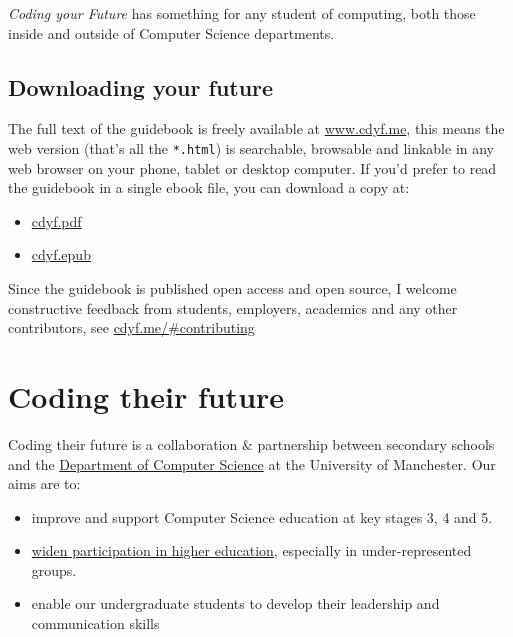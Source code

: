 \documentclass[
  12pt,
]{book}
\providecommand{\tightlist}{%
  \setlength{\itemsep}{0pt}\setlength{\parskip}{0pt}}
\begin{document}
\emph{Coding your Future} has something for any student of computing, both those inside and outside of Computer Science departments. 👨🏿‍💻👨‍💻👩🏽‍💻👩‍💻👩🏿‍💻

\hypertarget{downloading}{%
\section{Downloading your future}\label{downloading}}

The full text of the guidebook is freely available at \href{https://www.cdyf.me/}{www.cdyf.me}, this means the web version (that's all the \texttt{*.html}) is searchable, browsable and linkable in any web browser on your phone, tablet or desktop computer. If you'd prefer to read the guidebook in a single ebook file, you can download a copy at:

\begin{itemize}
\tightlist
\item
  \href{https://www.cdyf.me/cdyf.pdf}{cdyf.pdf}
\item
  \href{https://www.cdyf.me/cdyf.epub}{cdyf.epub}
\end{itemize}

Since the guidebook is published open access and open source, I welcome constructive feedback from students, employers, academics and any other contributors, see \href{https://www.cdyf.me/\#contributing}{cdyf.me/\#contributing}

\hypertarget{coding-their-future}{%
\chapter{Coding their future}\label{coding-their-future}}

Coding their future is a collaboration \& partnership between secondary schools and the \href{https://www.cs.manchester.ac.uk/}{Department of Computer Science} at the University of Manchester. Our aims are to:

\begin{itemize}
\tightlist
\item
  improve and support Computer Science education at key stages 3, 4 and 5. \citep{shutdownrestart, afterthereboot, cse, cambridgegcse}
\item
  \href{https://www.manchester.ac.uk/discover/social-responsibility/widening-participation/}{widen participation in higher education}, especially in under-represented groups. \citep{wideningparticipation, classceiling, nicebutdim, breakintoelite}
\item
  enable our undergraduate students to develop their leadership and communication skills
\end{itemize}
\end{document}
